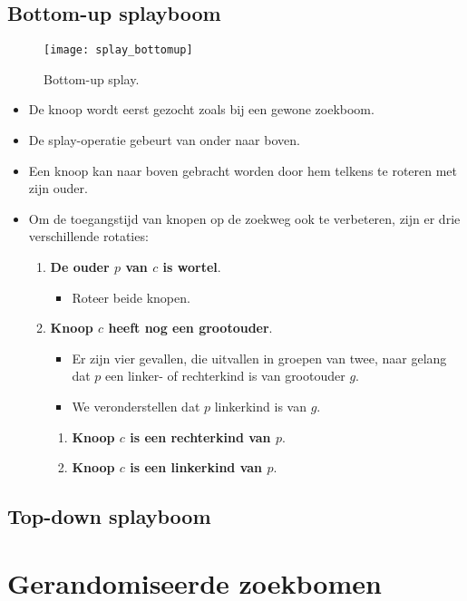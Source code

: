 \subsection{Bottom-up splayboom}
\begin{figure}[ht]
    \centering
    \texttt{[image: splay\_bottomup]}
    \caption{Bottom-up splay.}
    \label{fig:splay_bottomup}
\end{figure}
\begin{itemize}
    \item De knoop wordt eerst gezocht zoals bij een gewone zoekboom.
    \item De splay-operatie gebeurt van onder naar boven.
    \item Een knoop kan naar boven gebracht worden door hem telkens te roteren met zijn ouder.
    \item Om de toegangstijd van knopen op de zoekweg ook te verbeteren, zijn er drie verschillende rotaties:
    \begin{enumerate}
        \item \textbf{De ouder $p$ van $c$ is wortel}. 
        \begin{itemize}
            \item Roteer beide knopen.
        \end{itemize}
        \item \textbf{Knoop $c$ heeft nog een grootouder}.
        \begin{itemize}
            \item Er zijn vier gevallen, die uitvallen in groepen van twee, naar gelang dat $p$ een linker- of rechterkind is van grootouder $g$.
            \item We veronderstellen dat $p$ linkerkind is van $g$.
        \end{itemize}
        
        \begin{enumerate}
            \item \textbf{Knoop $c$ is een rechterkind van $p$}.
            \item \textbf{Knoop $c$ is een linkerkind van $p$}.
        \end{enumerate}
    \end{enumerate}
\end{itemize}
\subsection{Top-down splayboom}


\section{Gerandomiseerde zoekbomen}
\label{sec:gerandomiseerde-zoekbomen}